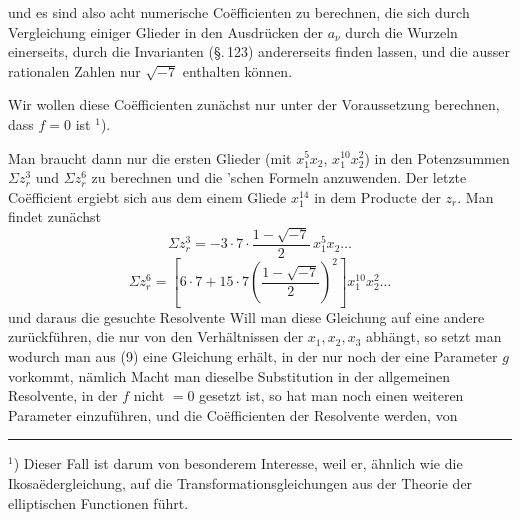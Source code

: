 
und es sind also acht numerische Co\"efficienten zu berechnen, die
sich durch Vergleichung einiger Glieder in den Ausdr\"ucken der
$a_\nu$ durch die Wurzeln einerseits, durch die Invarianten (\S.\,123)
andererseits finden lassen, und die ausser rationalen Zahlen nur
$\sqrt{-7}$ enthalten k\"onnen.

Wir wollen diese Co\"efficienten zun\"achst nur unter der
Voraussetzung berechnen, dass $f=0$ ist ${}^1$).

Man braucht dann nur die ersten Glieder (mit $x_1^5x_2$, $x_1^{10}x_2^2$)
in den Potenzsummen $\Sigma z_r^3$ und $\Sigma z_r^6$ zu berechnen und die
'schen Formeln anzuwenden. Der letzte Co\"efficient ergiebt
sich aus dem einem Gliede $x_1^{14}$ in dem Producte der $z_r$. Man
findet zun\"achst
\[
\Sigma z_r^3 = -3\cdot7\cdot\frac{1-\sqrt{-7}}{2}\,x_1^5x_2\dots
\]
\[
\Sigma z_r^6 = \left[6\cdot7 + 15\cdot7\left(\frac{1-\sqrt{-7}}{2}\right)^2\right]x_1^{10}x_2^2\dots
\]
und daraus die gesuchte Resolvente
Will man diese Gleichung auf eine andere zur\"uckf\"uhren, die
nur von den Verh\"altnissen der $x_1, x_2, x_3$ abh\"angt, so setzt man
wodurch man aus (9) eine Gleichung erh\"alt, in der nur noch der
eine Parameter $g$ vorkommt, n\"amlich
Macht man dieselbe Substitution in der allgemeinen Resol\-vente,
in der $f$ nicht $=0$ gesetzt ist, so hat man noch einen
weiteren Parameter
einzuf\"uhren, und die Co\"efficienten der Resolvente werden, von

\par\noindent\rule{0.3\linewidth}{0.4pt}\par
${}^1$) Dieser Fall ist darum von besonderem Interesse, weil er, \"ahnlich
wie die Ikosa\"edergleichung, auf die Transformationsgleichungen aus der
Theorie der elliptischen Functionen f\"uhrt.
